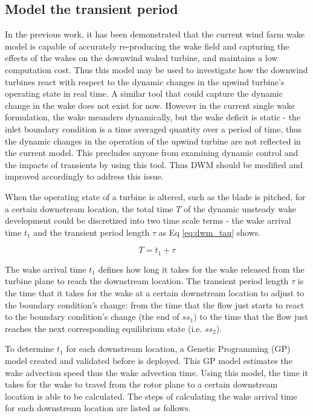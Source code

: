 \documentclass{umthesis}
\begin{document}
\subsection{Model the transient period}
In the previous work, it has been demonstrated that the current wind farm wake model is capable of accurately re-producing the wake field and capturing the effects of the wakes on the downwind waked turbine, and maintains a low computation cost. Thus this model may be used to investigate how the downwind turbines react with respect to the dynamic changes in the upwind turbine’s operating state in real time. A similar tool that could capture the dynamic change in the wake does not exist for now. However in the current single wake formulation, the wake meanders dynamically, but the wake deficit is static - the inlet boundary condition is a time averaged quantity over a period of time, thus the dynamic changes in the operation of the upwind turbine are not reflected in the current model. This precludes anyone from examining dynamic control and the impacts of transients by using this tool. Thus DWM should be modified and improved accordingly to address this issue.

When the operating state of a turbine is altered, such as the blade is pitched, for a certain downstream location, the total time $T$ of the dynamic unsteady wake development could be discretized into two time scale terms - the wake arrival time $t_1$ and the transient period length $\tau$ as Eq \ref{eq:dwm_tau} shows. 

\begin{equation}\label{eq:dwm_tau}
  T = t_1 + \tau
\end{equation}

The wake arrival time $t_1$ defines how long it takes for the wake released from the turbine plane to reach the downstream location. The transient period length $\tau$ is the time that it takes for the wake at a certain downstream location to adjust to the boundary condition’s change: from the time that the flow just starts to react to the boundary condition’s change (the end of $ss_1$) to the time that the flow just reaches the next corresponding equilibrium state (i.e. $ss_2$).

To determine $t_1$ for each downstream location, a Genetic Programming (GP) model created and validated before is deployed. This GP model estimates the wake advection speed thus the wake advection time. Using this model, the time it takes for the wake to travel from the rotor plane to a certain downstream location is able to be calculated. The steps of calculating the wake arrival time for each downstream location are listed as follows.
\end{document}
